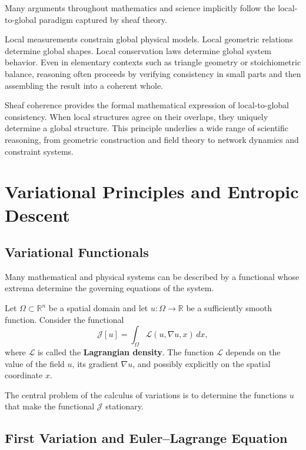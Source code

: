 \documentclass[11pt, openany]{book}
\theoremstyle{plain}
\theoremstyle{definition}
\theoremstyle{remark}
\begin{document}
Many arguments throughout mathematics and science implicitly follow the
local-to-global paradigm captured by sheaf theory.

Local measurements constrain global physical models.  Local geometric
relations determine global shapes.  Local conservation laws determine
global system behavior.  Even in elementary contexts such as triangle
geometry or stoichiometric balance, reasoning often proceeds by
verifying consistency in small parts and then assembling the result into
a coherent whole.

\begin{principle}
Sheaf coherence provides the formal mathematical expression of
local-to-global consistency.  When local structures agree on their
overlaps, they uniquely determine a global structure.  This principle
underlies a wide range of scientific reasoning, from geometric
construction and field theory to network dynamics and constraint
systems.
\end{principle}

\chapter{Variational Principles and Entropic Descent}

\section{Variational Functionals}

Many mathematical and physical systems can be described by a functional
whose extrema determine the governing equations of the system.

Let $\Omega\subset\mathbb{R}^n$ be a spatial domain and let
$u:\Omega\to\mathbb{R}$ be a sufficiently smooth function.  Consider the
functional
\[
\mathcal{J}[u]
=
\int_\Omega
\mathcal{L}(u,\nabla u,x)\,dx,
\]
where $\mathcal{L}$ is called the \textbf{Lagrangian density}.  The
function $\mathcal{L}$ depends on the value of the field $u$, its
gradient $\nabla u$, and possibly explicitly on the spatial coordinate
$x$.

The central problem of the calculus of variations is to determine the
functions $u$ that make the functional $\mathcal{J}$ stationary.

\section{First Variation and Euler--Lagrange Equation}
\end{document}
